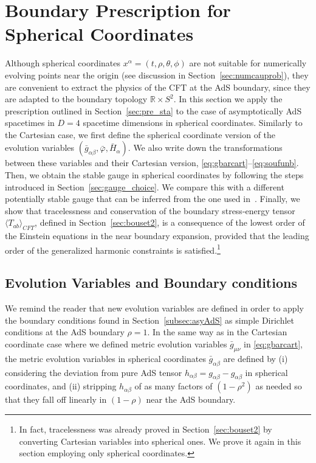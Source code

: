 \documentclass[aps,letterpaper,twocolumn,nofootinbib]{revtex4}
\numberwithin{equation}{section}
\begin{document}
\section{Boundary Prescription for Spherical Coordinates}\label{sec:sphevvarboucon}

Although spherical coordinates $x^\alpha=(t,\rho,\theta,\phi)$ are not suitable for numerically evolving points near the origin (see discussion in Section~\ref{sec:numcauprob}), they are convenient to extract the physics of the CFT at the AdS boundary, since they are adapted to the boundary topology $\mathbb{R}\times S^2$.
In this section we apply the prescription outlined in Section~\ref{sec:pre_sta} to the case of asymptotically AdS spacetimes in $D=4$ spacetime dimensions in spherical coordinates. Similarly to the Cartesian case, we first define the spherical coordinate version of the evolution variables $(\bar{g}_{\alpha\beta},\bar{\varphi},\bar{H}_\alpha)$. We also write down the transformations between these variables and their Cartesian version, \eqref{eq:gbarcart}--\eqref{eq:soufunb}. Then, we obtain the stable gauge in spherical coordinates by following the steps introduced in Section~\ref{sec:gauge_choice}. We compare this with a different potentially stable gauge that can be inferred from the one used in~\cite{Bantilan:2012vu}. Finally, we show that tracelessness and conservation of the boundary stress-energy tensor $\langle T_{ab}\rangle_{CFT}$, defined in Section~\ref{sec:bouset2}, is a consequence of the lowest order of the Einstein equations in the near boundary expansion, provided that the leading order of the generalized harmonic constraints is satisfied.\footnote{In fact, tracelessness was already proved in Section~\ref{sec:bouset2} by converting Cartesian variables into spherical ones. We prove it again in this section employing only spherical coordinates.}

\subsection{Evolution Variables and Boundary conditions}

We remind the reader that new evolution variables are defined in order to apply the boundary conditions found in Section~\ref{subsec:asyAdS} as simple Dirichlet conditions at the AdS boundary $\rho=1$. In the same way as in the Cartesian coordinate case where we defined metric evolution variables $\bar{g}_{\mu\nu}$ in \eqref{eq:gbarcart}, the metric evolution variables in spherical coordinates $\bar{g}_{\alpha\beta}$ are defined by (i) considering the deviation from pure AdS tensor $h_{\alpha\beta}=g_{\alpha\beta}-\hat{g}_{\alpha\beta}$ in spherical coordinates, and (ii) stripping $h_{\alpha\beta}$ of as many factors of $(1-\rho^2)$ as needed so that they fall off linearly in $(1-\rho)$ near the AdS boundary.
\end{document}
